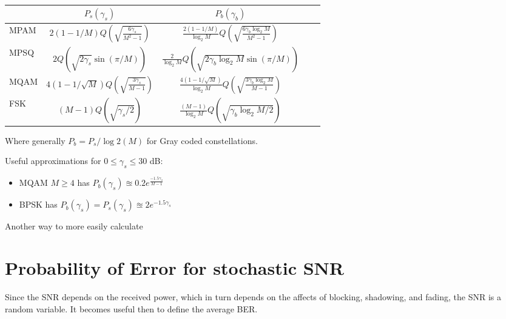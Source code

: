 \documentclass[12pt]{report} %
\begin{document}
\begin{table}[htbp]
  \centering
  \caption{}
  \begin{tabular}{lcccc}                                                                                                                                            \\
    \cmidrule(r){1-3} & $P_s(\gamma_s)$                                  & $P_b(\gamma_b)$                                                             \\
    \midrule MPAM     & $2(1-1/M)Q(\sqrt{\frac{6\gamma_s}{M^2-1}})$      & $\frac{2(1-1/M)}{\log_{2}M}Q(\sqrt{\frac{6\gamma_b\log_{2}M}{M^2-1}})$      \\
    \midrule MPSQ     & $2Q(\sqrt{2\gamma_s}\sin(\pi/M))$                & $\frac{2}{\log_{2}M}Q(\sqrt{2\gamma_b\log_{2}M}\sin(\pi/M))$                \\
    \midrule MQAM     & $4(1-1/\sqrt{M})Q(\sqrt{\frac{3\gamma_s}{M-1}})$ & $\frac{4(1-1/\sqrt{M})}{\log_{2}M}Q(\sqrt{\frac{3\gamma_b\log_{2}M}{M-1}})$ \\
    \midrule FSK      & $(M-1)Q(\sqrt{\gamma_s/2})$                      & $\frac{(M-1)}{\log_{2} M}Q(\sqrt{\gamma_b \log_{2} M/2})$                   \\
    \bottomrule
  \end{tabular}
  \label{tab:constellation_pe}
\end{table}

Where generally $P_b = P_s / \log{2}(M)$ for Gray coded constellations.

Useful approximations for $0 \leq \gamma_s \leq 30$ dB:
\begin{itemize}
  \item MQAM $M \geq 4$ has $P_b(\gamma_s) \approxeq 0.2 e^{\frac{-1.5\gamma_s}{M-1}}$
  \item BPSK has $P_b(\gamma_s) = P_s(\gamma_s) \approxeq 2 e^{-1.5\gamma_s}$
\end{itemize}

Another way to more easily calculate

\section{Probability of Error for stochastic SNR}
Since the SNR depends on the received power, which in turn depends on the
affects of blocking, shadowing, and fading, the SNR is a random variable. It
becomes useful then to define the average \gls{BER}.
\end{document}
